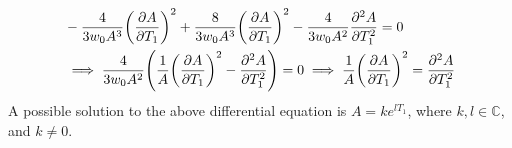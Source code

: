 \documentclass{article}
\newcommand{\CC}{\mathbb{C}}
\DeclarePairedDelimiter{\paran}{(}{)}%
\begin{document}
\begin{align}
    &-\frac{4}{3w_0A^3}\paran*{\frac{\partial A}{\partial T_1}}^2+\frac{8}{3w_0A^3}\paran*{\frac{\partial A}{\partial T_1}}^2-\frac{4}{3w_0A^2}\frac{\partial^2A}{\partial T_1^2}=0\\
    &\implies \frac{4}{3w_0A^2}\paran*{\frac{1}{A}\paran*{\frac{\partial A}{\partial T_1}}^2-\frac{\partial^2 A}{\partial T_1^2}}=0 \implies \frac{1}{A}\paran*{\frac{\partial A}{\partial T_1}}^2=\frac{\partial ^2A}{\partial T_1^2}
\end{align}
A possible solution to the above differential equation is $A=ke^{lT_1}$, where $k,l \in \CC$, and $k\neq 0$.

\break
\end{document}
